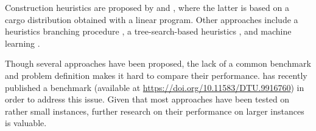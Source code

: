 \documentclass[preprint,12pt,authoryear]{elsarticle}
\begin{document}
Construction heuristics are proposed by \cite{Sciomachen2003TheProblem} and \cite{Delgado2012AStowage}, where the latter is based on a cargo distribution obtained with a linear program. Other approaches include a heuristics branching procedure \citep{Sciomachen2007AProductivity}, a tree-search-based heuristics \citep{Zhao2018ContainerSearch}, and machine learning \citep{Shen2017AProblem}. 

Though several approaches have been proposed, the lack of a common benchmark and problem definition makes it hard to compare their performance. \cite{Larsen2021AProblem} has recently published a benchmark (available at \url{https://doi.org/10.11583/DTU.9916760}) in order to address this issue. Given that most approaches have been tested on rather small instances, further research on their performance on larger instances is valuable.
\end{document}
